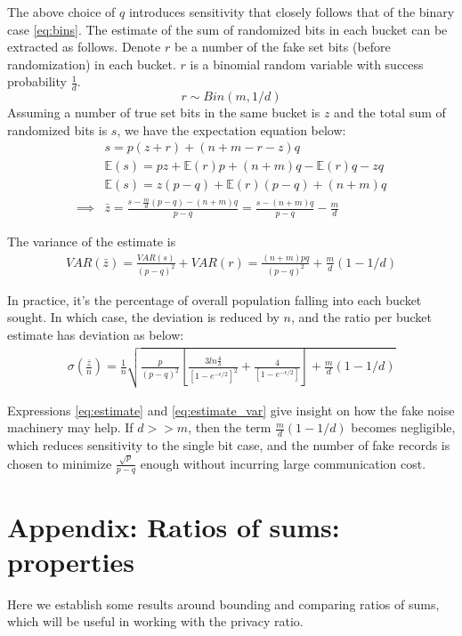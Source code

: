 \documentclass[11pt]{article}
\newcommand{\E}{\mathbb{E}} %
\begin{document}
The above choice of $q$ introduces sensitivity that closely follows that of the binary case \ref{eq:bins}.    The estimate of the sum of randomized bits in each bucket can be extracted as follows.  Denote $r$ be a number of the fake set bits (before randomization) in each bucket. $r$ is a binomial random variable with success probability $\frac{1}{d}$.
\[ r \sim Bin(m, 1/d) \]
Assuming a number of true set bits in the same bucket is $z$ and the total sum of randomized bits is $s$, we have the expectation equation below: 
\begin{align}
& s = p(z + r)  + (n+m - r - z)q \\
& \E(s) = pz + \E(r)p + (n+m)q - \E(r)q - zq\\
& \E(s) = z(p-q) + \E(r)(p-q) + (n+m)q \\
\implies & \bar{z} = \frac{s - \frac{m}{d}(p-q) - (n+m)q}{p-q} =  \frac{s - (n+m)q}{p-q}  - \frac{m}{d} \label{eq:estimate}
\end{align}

The variance of the estimate is
\begin{align*}
VAR( \bar{z} ) =  \frac{VAR(s)}{(p-q)^2}  + VAR(r) = \frac{(n+m)pq}{(p-q)^2} + \frac{m}{d}(1-1/d)
\end{align*}


In practice, it's the percentage of overall population falling into each bucket sought.  In which case, the deviation is reduced by $n$, and the ratio per bucket estimate has deviation as below:
\begin{align}
\sigma( \frac{\bar{z}}{n} ) =  \frac{1}{n} \sqrt { \frac{p}{(p-q)^2} \left [   \frac  { 3  ln\frac{4}{\delta}}  { \left [ 1 - e^{-\epsilon/2}\right ] ^2}  + \frac{4}{ \left [ 1 - e^{-\epsilon/2}\right ] }   \right ] + \frac{m}{d}(1-1/d) } \label{eq:estimate_var}
\end{align}

Expressions \ref{eq:estimate} and \ref{eq:estimate_var} give insight on how the fake noise machinery may help.  If $d >> m$, then the term $\frac{m}{d}(1-1/d)$ becomes negligible, which reduces sensitivity to the single bit case, and the number of fake records is chosen to minimize $\frac{\sqrt{p}}{p-q}$ enough without incurring large communication cost. 

\section{Appendix: Ratios of sums: properties}

Here we establish some results around bounding and comparing ratios of sums, which will be useful in working with the privacy ratio.
\end{document}
